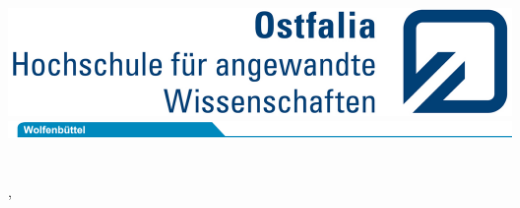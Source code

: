 % 
%
\begin{titlepage}
	\vspace*{-3.0cm}
	\hspace*{ 6.90cm}\includegraphics[scale=0.93]{ostfalia/Ostfalia_LS_RGB_klein.jpg}\\
	\hspace*{-1.00cm}\includegraphics[scale=1.20]{ostfalia/Reiter_Wolfen_RGB_174mm.jpg}\\
	
	\\
	
	\hrulefill\\
	
	\noindent{\Large\textsf{\studenteins, \matrNumbereins\\}}
	\ifdefined\studentzwei%
	\if\studentzwei\empty
	\else
	{\Large\textsf{\studentzwei, \matrNumberzwei\\}}
	\fi
	
	
	\vspace{2em}
	\begin{center}
		
		\textbf{
			\textsf{\huge\titel \\[0.3ex]}}
		\end{center}
	

\end{titlepage}

